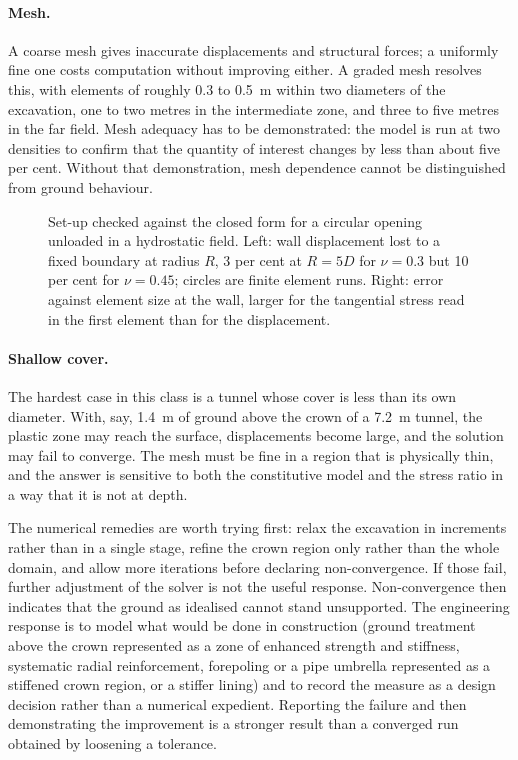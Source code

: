 \paragraph{Mesh.}
A coarse mesh gives inaccurate displacements and structural forces; a uniformly
fine one costs computation without improving either. A graded mesh resolves
this, with elements of roughly 0.3 to 0.5~m within two diameters of the
excavation, one to two metres in the intermediate zone, and three to five
metres in the far field. Mesh adequacy has to be demonstrated: the model is run
at two densities to confirm that the quantity of interest changes by
less than about five per cent. Without that demonstration, mesh dependence
cannot be distinguished from ground behaviour.

\begin{figure}[htbp]
\centering
{}
\caption{Set-up checked against the closed form for a circular opening unloaded in a hydrostatic field. Left: wall displacement lost to a fixed boundary at radius $R$, 3 per cent at $R = 5D$ for $\nu = 0.3$ but 10 per cent for $\nu = 0.45$; circles are finite element runs. Right: error against element size at the wall, larger for the tangential stress read in the first element than for the displacement.}
\label{fig:extent-mesh}
\end{figure}

\paragraph{Shallow cover.}
The hardest case in this class is a tunnel whose cover is less than its own
diameter. With, say, 1.4~m of ground above the crown of a 7.2~m tunnel, the
plastic zone may reach the surface, displacements become large, and the
solution may fail to converge. The mesh must be fine in a region that is
physically thin, and the answer is sensitive to both the constitutive model and
the stress ratio in a way that it is not at depth.

The numerical remedies are worth trying first: relax the excavation in
increments rather than in a single stage, refine the crown region only rather
than the whole domain, and allow more iterations before declaring
non-convergence. If those fail, further adjustment of the solver is not the useful
response. Non-convergence then indicates that the
ground as idealised cannot stand unsupported. The engineering
response is to model what would be done in construction (ground treatment above the
crown represented as a zone of enhanced strength and stiffness, systematic
radial reinforcement, forepoling or a pipe umbrella represented as a stiffened
crown region, or a stiffer lining) and to record the measure as a design
decision rather than a numerical expedient. Reporting the failure and then
demonstrating the improvement is a stronger result than a converged run
obtained by loosening a tolerance.

